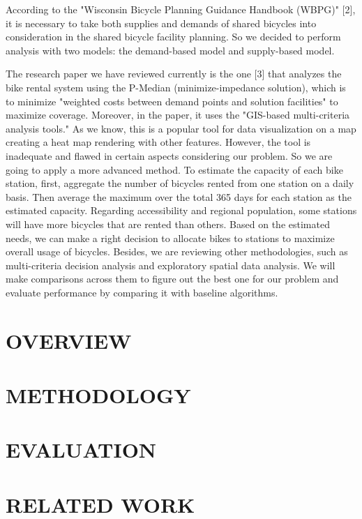 \documentclass[journal, letterpaper]{IEEEtran}
\begin{document}
According to the "Wisconsin Bicycle Planning Guidance Handbook (WBPG)" [2], it is necessary to take both supplies and demands of shared bicycles into consideration in the shared bicycle facility planning. So we decided to perform analysis with two models: the demand-based model and supply-based model.

The research paper we have reviewed currently is the one [3] that analyzes the bike rental system using the P-Median (minimize-impedance solution), which is to minimize "weighted costs between demand points and solution facilities" to maximize coverage. Moreover, in the paper, it uses the "GIS-based multi-criteria analysis tools." As we know, this is a popular tool for data visualization on a map creating a heat map rendering with other features. However, the tool is inadequate and flawed in certain aspects considering our problem. So we are going to apply a more advanced method. To estimate the capacity of each bike station, first, aggregate the number of bicycles rented from one station on a daily basis. Then average the maximum over the total 365 days for each station as the estimated capacity. Regarding accessibility and regional population, some stations will have more bicycles that are rented than others. Based on the estimated needs, we can make a right decision to allocate bikes to stations to maximize overall usage of bicycles. Besides, we are reviewing other methodologies, such as multi-criteria decision analysis and exploratory spatial data analysis. We will make comparisons across them to figure out the best one for our problem and evaluate performance by comparing it with baseline algorithms.
\section{OVERVIEW}
\large
\section{METHODOLOGY}
\large
\section{EVALUATION}
\large
\section{RELATED WORK}
\large
\end{document}
